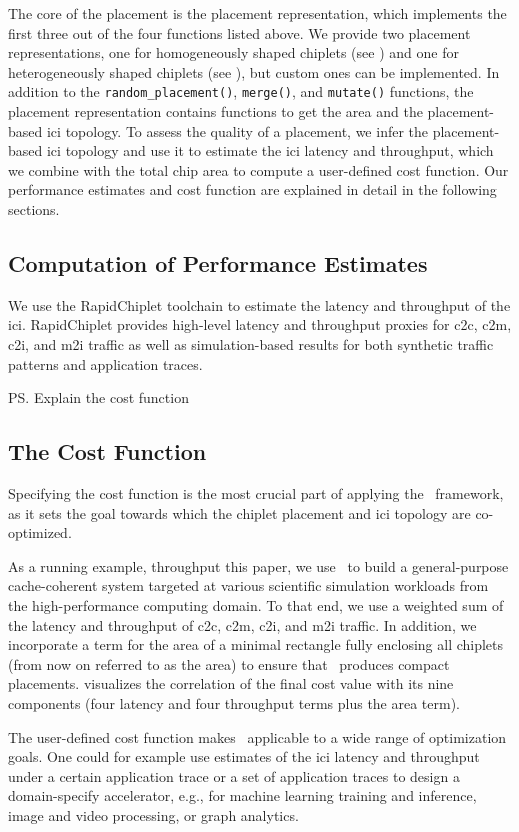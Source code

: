

The core of the placement is the placement representation, which implements the first three out of the four functions listed above.
We provide two placement representations, one for homogeneously shaped chiplets (see ) and one for heterogeneously shaped chiplets (see ), but custom ones can be implemented.
In addition to the \texttt{random\_placement()}, \texttt{merge()}, and \texttt{mutate()} functions, the placement representation contains functions to get the area and the placement-based \gls{ici} topology.
To assess the quality of a placement, we infer the placement-based \gls{ici} topology and use it to estimate the \gls{ici} latency and throughput, which we combine with the total chip area to compute a user-defined cost function.
Our performance estimates and cost function are explained in detail in the following sections.

\subsection{Computation of Performance Estimates}
\label{ssec:arch-proxies}

We use the RapidChiplet \cite{rapidchiplet} toolchain to estimate the latency and throughput of the \gls{ici}. RapidChiplet provides high-level latency and throughput proxies for \gls{c2c}, \gls{c2m}, \gls{c2i}, and \gls{m2i} traffic as well as simulation-based results for both synthetic traffic patterns and application traces.

\ps{Explain the cost function}


\subsection{The Cost Function}
\label{ssec:arch-cost}

Specifying the cost function is the most crucial part of applying the \name~framework, as it sets the goal towards which the chiplet placement and \gls{ici} topology are co-optimized.

As a running example, throughput this paper, we use \name~to build a general-purpose cache-coherent system targeted at various scientific simulation workloads from the high-performance computing domain. 
To that end, we use a weighted sum of the latency and throughput of \gls{c2c}, \gls{c2m}, \gls{c2i}, and \gls{m2i} traffic. 
In addition, we incorporate a term for the area of a minimal rectangle fully enclosing all chiplets (from now on referred to as the area) to ensure that \name~produces compact placements.
 visualizes the correlation of the final cost value with its nine components (four latency and four throughput terms plus the area term).

The user-defined cost function makes \name~applicable to a wide range of optimization goals. One could for example use estimates of the \gls{ici} latency and throughput under a certain application trace or a set of application traces to design a domain-specify accelerator, e.g., for machine learning training and inference, image and video processing, or graph analytics.
